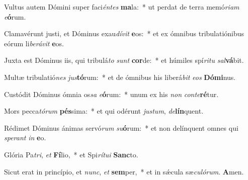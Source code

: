 \item Vultus autem Dómini super faci\textit{én}\textit{tes} \textbf{ma}la:~* ut perdat de terra memó\textit{ri}\textit{am} \textit{e}\textbf{ó}rum.
\item Clamavérunt justi, et Dóminus exau\textit{dí}\textit{vit} \textbf{e}os:~* et ex ómnibus tribulatiónibus eórum li\textit{be}\textit{rá}\textit{vit} \textbf{e}os.
\item Juxta est Dóminus iis, qui tribulá\textit{to} \textit{sunt} \textbf{cor}de:~* et húmiles spí\textit{ri}\textit{tu} \textit{sal}\textbf{vá}bit.
\item Multæ tribulatió\textit{nes} \textit{jus}\textbf{tó}\-rum:~* et de ómnibus his liberá\textit{bit} \textit{e}\textit{os} \textbf{Dó}\textbf{mi}nus.
\item Custódit Dóminus ómnia os\textit{sa} \textit{e}\textbf{ó}rum:~* unum ex his \textit{non} \textit{con}\textit{te}\textbf{ré}tur.
\item Mors pecca\textit{tó}\textit{rum} \textbf{pés}sima:~* et qui odérunt \textit{jus}\textit{tum}, \textit{de}\textbf{lín}quent.
\item Rédimet Dóminus ánimas servó\textit{rum} \textit{su}\textbf{ó}rum:~* et non delínquent omnes qui \textit{spe}\textit{rant} \textit{in} \textbf{e}o.
\item Glória Pa\textit{tri}, \textit{et} \textbf{Fí}lio,~* et Spi\textit{rí}\textit{tu}\textit{i} \textbf{Sanc}to.
\item Sicut erat in princípio, et \textit{nunc}, \textit{et} \textbf{sem}per,~* et in sǽcula sæ\textit{cu}\textit{ló}\textit{rum}. \textbf{A}men.

